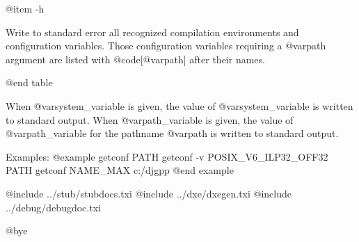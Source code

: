 @item -h

Write to standard error all recognized compilation environments and 
configuration variables.  Those configuration variables requiring a
@var{path} argument are listed with @code{[@var{path}]} after their names.

@end table

When @var{system_variable} is given, the value of @var{system_variable}
is written to standard output.  When @var{path_variable} is given, the
value of @var{path_variable} for the pathname @var{path} is written to
standard output.

Examples:
@example
getconf PATH
getconf -v POSIX_V6_ILP32_OFF32 PATH
getconf NAME_MAX c:/djgpp
@end example

@include ../stub/stubdocs.txi
@include ../dxe/dxegen.txi
@include ../debug/debugdoc.txi

@bye
